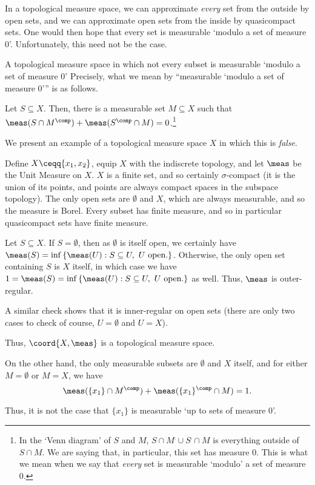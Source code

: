 In a topological measure space, we can approximate \emph{every} set from the outside by open sets, and we can approximate open sets from the inside by quasicompact sets.  One would then hope that every set is measurable `modulo a set of measure $0$'.  Unfortunately, this need not be the case.
\begin{exm}{A topological measure space in which not every subset is measurable `modulo a set of measure $0$'}{}
Precisely, what we mean by ``measurable `modulo a set of measure $0$''' is as follows.
\begin{displayquote}
Let $S\subseteq X$.  Then, there is a measurable set $M\subseteq X$ such that $\meas (S\cap M^{\comp})+\meas (S^{\comp}\cap M)=0$.\footnote{In the `Venn diagram' of $S$ and $M$, $S\cap M^{\comp}\cup S^{\comp}\cap M$ is everything outside of $S\cap M$.  We are saying that, in particular, this set has measure $0$.  This is what we mean when we say that \emph{every} set is measurable `modulo' a set of measure $0$.}
\end{displayquote}
We present an example of a topological measure space $X$ in which this is \emph{false}.

Define $X\ceqq \{ x_1,x_2\}$, equip $X$ with the indiscrete topology, and let $\meas$ be the Unit Measure on $X$.  $X$ is a finite set, and so certainly $\sigma$-compact (it is the union of its points, and points are always compact spaces in the subspace topology).  The only open sets are $\emptyset$ and $X$, which are always measurable, and so the measure is Borel.  Every subset has finite measure, and so in particular quasicompact sets have finite measure.

Let $S\subseteq X$.  If $S=\emptyset$, then as $\emptyset$ is itself open, we certainly have $\meas (S)=\inf \left\{ \meas (U):S\subseteq U,\ U\text{ open.}\right\}$.  Otherwise, the only open set containing $S$ is $X$ itself, in which case we have $1=\meas (S)=\inf \left\{ \meas (U):S\subseteq U,\ U\text{ open.}\right\}$ as well.  Thus, $\meas$ is outer-regular.

A similar check shows that it is inner-regular on open sets (there are only two cases to check of course, $U=\emptyset$ and $U=X$).

Thus, $\coord{X,\meas}$ is a topological measure space.

On the other hand, the only measurable subsets are $\emptyset$ and $X$ itself, and for either $M=\emptyset$ or $M=X$, we have
\begin{equation}
\meas (\{ x_1\} \cap M^{\comp})+\meas (\{ x_1\} ^{\comp}\cap M)=1.
\end{equation}

Thus, it is not the case that $\{ x_1\}$ is measurable `up to sets of measure $0$'.
\end{exm}


